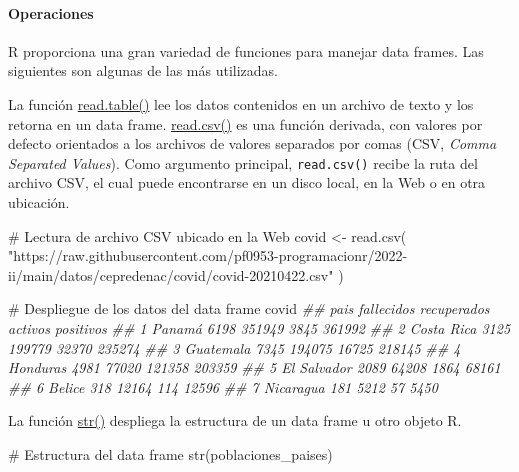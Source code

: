 \documentclass[
  letterpaper,
  DIV=11,
  numbers=noendperiod]{scrreprt}
\let\oldparagraph\paragraph
\renewcommand{\paragraph}[1]{\oldparagraph{#1}\mbox{}}
\newenvironment{Shaded}{\begin{snugshade}}{\end{snugshade}}
\newcommand{\CommentTok}[1]{\textcolor[rgb]{0.37,0.37,0.37}{#1}}
\newcommand{\DocumentationTok}[1]{\textcolor[rgb]{0.37,0.37,0.37}{\textit{#1}}}
\newcommand{\FunctionTok}[1]{\textcolor[rgb]{0.28,0.35,0.67}{#1}}
\newcommand{\NormalTok}[1]{\textcolor[rgb]{0.00,0.23,0.31}{#1}}
\newcommand{\OtherTok}[1]{\textcolor[rgb]{0.00,0.23,0.31}{#1}}
\newcommand{\StringTok}[1]{\textcolor[rgb]{0.13,0.47,0.30}{#1}}
\begin{document}
\hypertarget{operaciones-3}{%
\paragraph{Operaciones}\label{operaciones-3}}

R proporciona una gran variedad de funciones para manejar data frames.
Las siguientes son algunas de las más utilizadas.

La función \href{https://rdrr.io/r/utils/read.table.html}{read.table()}
lee los datos contenidos en un archivo de texto y los retorna en un data
frame. \href{https://rdrr.io/r/utils/read.table.html}{read.csv()} es una
función derivada, con valores por defecto orientados a los archivos de
valores separados por comas (CSV, \emph{Comma Separated Values}). Como
argumento principal, \texttt{read.csv()} recibe la ruta del archivo CSV,
el cual puede encontrarse en un disco local, en la Web o en otra
ubicación.

\begin{Shaded}
\begin{Highlighting}[]
\CommentTok{\# Lectura de archivo CSV ubicado en la Web}
\NormalTok{covid }\OtherTok{\textless{}{-}}
  \FunctionTok{read.csv}\NormalTok{(}
    \StringTok{"https://raw.githubusercontent.com/pf0953{-}programacionr/2022{-}ii/main/datos/cepredenac/covid/covid{-}20210422.csv"}
\NormalTok{  )}

\CommentTok{\# Despliegue de los datos del data frame}
\NormalTok{covid}
\DocumentationTok{\#\#          pais fallecidos recuperados activos positivos}
\DocumentationTok{\#\# 1      Panamá       6198      351949    3845    361992}
\DocumentationTok{\#\# 2  Costa Rica       3125      199779   32370    235274}
\DocumentationTok{\#\# 3   Guatemala       7345      194075   16725    218145}
\DocumentationTok{\#\# 4    Honduras       4981       77020  121358    203359}
\DocumentationTok{\#\# 5 El Salvador       2089       64208    1864     68161}
\DocumentationTok{\#\# 6      Belice        318       12164     114     12596}
\DocumentationTok{\#\# 7   Nicaragua        181        5212      57      5450}
\end{Highlighting}
\end{Shaded}

La función \href{https://rdrr.io/r/utils/str.html}{str()} despliega la
estructura de un data frame u otro objeto R.

\begin{Shaded}
\begin{Highlighting}[]
\CommentTok{\# Estructura del data frame}
\FunctionTok{str}\NormalTok{(poblaciones\_paises)}
\end{Highlighting}
\end{Shaded}
\end{document}
